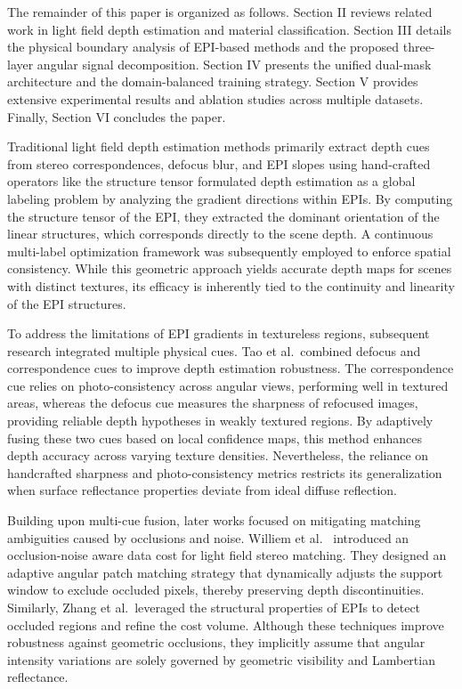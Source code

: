 \documentclass[lettersize,journal]{IEEEtran}
\begin{document}
The remainder of this paper is organized as follows. Section II reviews related work in light field depth estimation and material classification. Section III details the physical boundary analysis of EPI-based methods and the proposed three-layer angular signal decomposition. Section IV presents the unified dual-mask architecture and the domain-balanced training strategy. Section V provides extensive experimental results and ablation studies across multiple datasets. Finally, Section VI concludes the paper.

Traditional light field depth estimation methods primarily extract depth cues from stereo correspondences, defocus blur, and EPI slopes using hand-crafted operators like the structure tensor formulated depth estimation as a global labeling problem by analyzing the gradient directions within EPIs. By computing the structure tensor of the EPI, they extracted the dominant orientation of the linear structures, which corresponds directly to the scene depth. A continuous multi-label optimization framework was subsequently employed to enforce spatial consistency. While this geometric approach yields accurate depth maps for scenes with distinct textures, its efficacy is inherently tied to the continuity and linearity of the EPI structures.

To address the limitations of EPI gradients in textureless regions, subsequent research integrated multiple physical cues. Tao et al.\ combined defocus and correspondence cues to improve depth estimation robustness. The correspondence cue relies on photo-consistency across angular views, performing well in textured areas, whereas the defocus cue measures the sharpness of refocused images, providing reliable depth hypotheses in weakly textured regions. By adaptively fusing these two cues based on local confidence maps, this method enhances depth accuracy across varying texture densities. Nevertheless, the reliance on handcrafted sharpness and photo-consistency metrics restricts its generalization when surface reflectance properties deviate from ideal diffuse reflection.

Building upon multi-cue fusion, later works focused on mitigating matching ambiguities caused by occlusions and noise. Williem et al.\ \cite{ronneberger2015} introduced an occlusion-noise aware data cost for light field stereo matching. They designed an adaptive angular patch matching strategy that dynamically adjusts the support window to exclude occluded pixels, thereby preserving depth discontinuities. Similarly, Zhang et al.\ leveraged the structural properties of EPIs to detect occluded regions and refine the cost volume. Although these techniques improve robustness against geometric occlusions, they implicitly assume that angular intensity variations are solely governed by geometric visibility and Lambertian reflectance.
\end{document}
